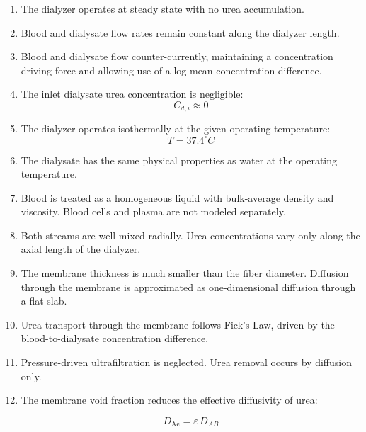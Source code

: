 \documentclass[10.5pt]{article}
\begin{document}
\begin{enumerate}
\item The dialyzer operates at steady state with no urea accumulation.

\item Blood and dialysate flow rates remain constant along the dialyzer length.

\item Blood and dialysate flow counter-currently, maintaining a concentration driving force and allowing use of a log-mean concentration difference.

\item The inlet dialysate urea concentration is negligible:
\vspace{-1em}
\[
C_{d,i} \approx 0
\]
\vspace{-4em}
\item The dialyzer operates isothermally at the given operating temperature:
\vspace{-1em}
\[
T = 37.4^\circ C
\]
\vspace{-4em}

\item The dialysate has the same physical properties as water at the operating temperature.

\item Blood is treated as a homogeneous liquid with bulk-average density and viscosity. Blood cells and plasma are not modeled separately.

\item Both streams are well mixed radially. Urea concentrations vary only along the axial length of the dialyzer.

\item The membrane thickness is much smaller than the fiber diameter. Diffusion through the membrane is approximated as one-dimensional diffusion through a flat slab.

\item Urea transport through the membrane follows Fick's Law, driven by the blood-to-dialysate concentration difference.

\item Pressure-driven ultrafiltration is neglected. Urea removal occurs by diffusion only.

\item The membrane void fraction reduces the effective diffusivity of urea:

\vspace{-2em}

\[
D_{\text{Ae}} = \varepsilon \, D_{AB} %
\]


\end{enumerate}
\end{document}
